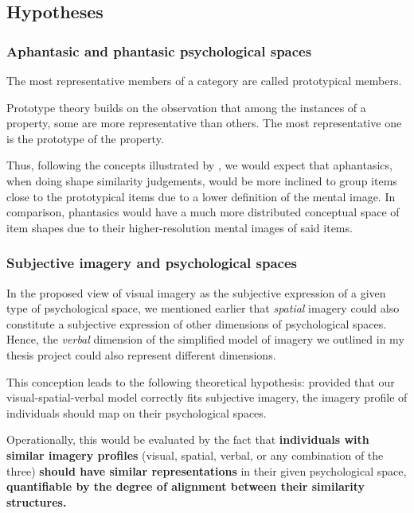 \documentclass[
  authoryear]{elsarticle}
\begin{document}
\subsection{Hypotheses}\label{hypotheses}

\subsubsection{Aphantasic and phantasic psychological
spaces}\label{aphantasic-and-phantasic-psychological-spaces}

The most representative members of a category are called prototypical
members.

Prototype theory builds on the observation that among the instances of a
property, some are more representative than others. The most
representative one is the prototype of the property.

Thus, following the concepts illustrated by \citet{gardenfors2004}, we
would expect that aphantasics, when doing shape similarity judgements,
would be more inclined to group items close to the prototypical items
due to a lower definition of the mental image. In comparison, phantasics
would have a much more distributed conceptual space of item shapes due
to their higher-resolution mental images of said items.

\subsubsection{Subjective imagery and psychological
spaces}\label{subjective-imagery-and-psychological-spaces}

In the proposed view of visual imagery as the subjective expression of a
given type of psychological space, we mentioned earlier that
\emph{spatial} imagery could also constitute a subjective expression of
other dimensions of psychological spaces. Hence, the \emph{verbal}
dimension of the simplified model of imagery we outlined in my thesis
project could also represent different dimensions.

This conception leads to the following theoretical hypothesis: provided
that our visual-spatial-verbal model correctly fits subjective imagery,
the imagery profile of individuals should map on their psychological
spaces.

Operationally, this would be evaluated by the fact that
\textbf{individuals with similar imagery profiles} (visual, spatial,
verbal, or any combination of the three) \textbf{should have similar
representations} in their given psychological space,
\textbf{quantifiable by the degree of alignment between their similarity
structures.}
\end{document}
